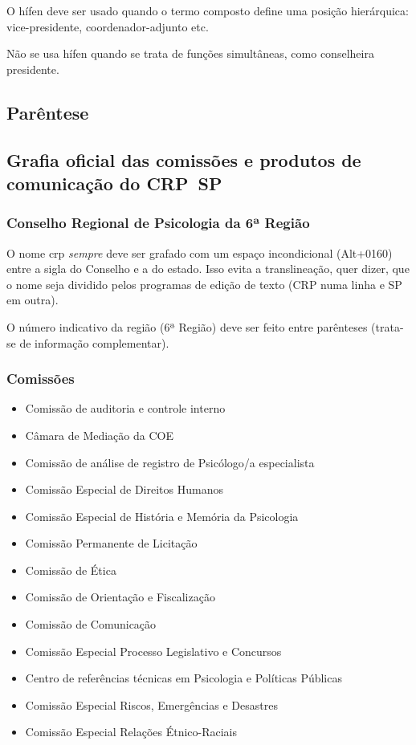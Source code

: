 O hífen deve ser usado quando o termo composto define uma posição hierárquica: vice-presidente, coordenador-adjunto etc.

Não se usa hífen quando se trata de funções simultâneas, como conselheira presidente.

\subsection{Parêntese}

\subsection{Grafia oficial das comissões e produtos de comunicação do CRP~SP}

\subsubsection{Conselho Regional de Psicologia da 6ª Região}

O nome \ac{crp} \emph{sempre} deve ser grafado com um espaço incondicional (Alt+0160) entre a sigla do Conselho e a do estado. Isso evita a translineação, quer dizer, que o nome seja dividido pelos programas de edição de texto (CRP numa linha e SP em outra).

O número indicativo da região (6ª Região) deve ser feito entre parênteses (trata-se de informação complementar).

\subsubsection{Comissões}

\begin{itemize}
    \item[\textbf{Caci}]{Comissão de auditoria e controle interno}
	\item[\textbf{CamCoe}]{Câmara de Mediação da COE}
	\item[\textbf{Carpe}]{Comissão de análise de registro de Psicólogo/a especialista}
	\item[\textbf{CDH}]{Comissão Especial de Direitos Humanos}
	\item[\textbf{CHM}]{Comissão Especial de História e Memória da Psicologia}
	\item[\textbf{CL}]{Comissão Permanente de Licitação}
	\item[\textbf{COE}]{Comissão de Ética}
	\item[\textbf{COF}]{Comissão de Orientação e Fiscalização}
	\item[\textbf{ComCom}]{Comissão de Comunicação}
	\item[\textbf{CPLC}]{Comissão Especial Processo Legislativo e Concursos}
	\item[\textbf{Crepop}]{Centro de referências técnicas em Psicologia e Políticas Públicas}
	\item[\textbf{Cred}]{Comissão Especial Riscos, Emergências e Desastres}
	\item[\textbf{Crer}]{Comissão Especial Relações Étnico-Raciais}
\end{itemize}

